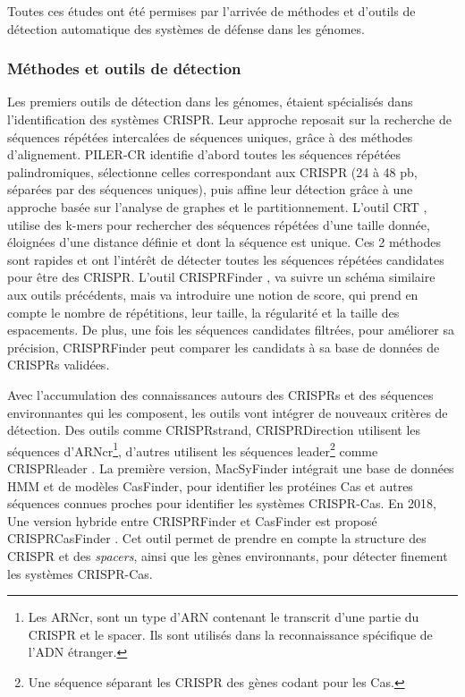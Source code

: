 Toutes ces études ont été permises par l'arrivée de méthodes et d'outils de détection automatique des systèmes de défense dans les génomes.

\subsubsection{Méthodes et outils de détection}
\label{sec:defmet}

Les premiers outils de détection dans les génomes, étaient spécialisés dans l'identification des systèmes CRISPR. Leur approche reposait sur la recherche de séquences répétées intercalées de séquences uniques, grâce à des méthodes d’alignement. PILER-CR \cite{edgar_piler-cr_2007} identifie d'abord toutes les séquences répétées palindromiques, sélectionne celles correspondant aux CRISPR (24 à 48 pb, séparées par des séquences uniques), puis affine leur détection grâce à une approche basée sur l’analyse de graphes et le partitionnement. L'outil CRT \cite{bland_crispr_2007}, utilise des k-mers pour rechercher des séquences répétées d'une taille donnée, éloignées d'une distance définie et dont la séquence est unique. Ces 2 méthodes sont rapides et ont l'intérêt de détecter toutes les séquences répétées candidates pour être des CRISPR. L'outil CRISPRFinder \cite{grissa_crisprfinder_2007}, va suivre un schéma similaire aux outils précédents, mais va introduire une notion de score, qui prend en compte le nombre de répétitions, leur taille, la régularité et la taille des espacements. De plus, une fois les séquences candidates filtrées, pour améliorer sa précision, CRISPRFinder peut comparer les candidats à sa base de données de CRISPRs validées.

Avec l'accumulation des connaissances autours des CRISPRs et des séquences environnantes qui les composent, les outils vont intégrer de nouveaux critères de détection. Des outils comme CRISPRstrand\cite{alkhnbashi_crisprstrand_2014}, CRISPRDirection\cite{biswas_accurate_2014} utilisent les séquences d'ARNcr\footnote{Les ARNcr, sont un type d'ARN contenant le transcrit d'une partie du CRISPR et le spacer. Ils sont utilisés dans la reconnaissance spécifique de l'ADN étranger.}, d'autres utilisent les séquences leader\footnote{Une séquence séparant les CRISPR des gènes codant pour les Cas.} comme CRISPRleader \cite{alkhnbashi_characterizing_2016}. La première version, MacSyFinder \cite{abby_macsyfinder_2014} intégrait une base de données HMM et de modèles CasFinder, pour identifier les protéines Cas et autres séquences connues proches pour identifier les systèmes CRISPR-Cas. En 2018, Une version hybride entre CRISPRFinder et CasFinder est proposé CRISPRCasFinder \cite{couvin_crisprcasfinder_2018}. Cet outil permet de prendre en compte la structure des CRISPR et des \textit{spacers}, ainsi que les gènes environnants, pour détecter finement les systèmes CRISPR-Cas.


